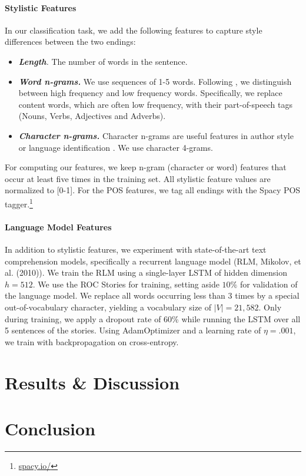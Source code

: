 \documentclass[11pt]{article}
\begin{document}
\paragraph{Stylistic Features}
In our classification task, we add the following features to capture style differences between the two endings:
\begin{itemize}
\item\textit{\textbf{Length}.} The number of words in the sentence.
\item\textit{\textbf{Word n-grams.}} We use sequences of 1-5 words. Following \cite{Tsur:2010,Schwartz:2013}, we distinguish between high frequency and low frequency words. 
Specifically, we replace content words, which are often low frequency, with their part-of-speech tags (Nouns, Verbs, Adjectives and Adverbs).
\item\textit{\textbf{Character n-grams.}} Character n-grams are useful features in author style \cite{Stamatatos:2009} or language identification \cite{lui2011cross}.
We use character 4-grams.
\end{itemize}
For computing our features, we keep n-gram (character or word) features that occur at least five times in the training set.
All stylistic feature values are normalized to [0-1].
For the POS features, we tag all endings with the Spacy POS tagger.\footnote{\url{spacy.io/}}

\paragraph{Language Model Features}
In addition to stylistic features, we experiment with state-of-the-art text comprehension models, specifically a recurrent language model (RLM, Mikolov, et al. (2010)\nocite{mikolov2010recurrent}).
We train the RLM using a single-layer LSTM \cite{hochreiter1997long} of hidden dimension $h=512$.
We use the ROC Stories for training, setting aside $10\%$ for validation of the language model. 
We replace all words occurring less than 3 times by a special out-of-vocabulary character, yielding a vocabulary size of $|V|=21,582$.
Only during training, we apply a dropout rate of 60\% while running the LSTM over all 5 sentences of the stories. 
Using AdamOptimizer \cite{kingma2014adam} and a learning rate of $\eta=.001$, we train with backpropagation on cross-entropy. %
\section{Results \& Discussion}


\section{Conclusion}




\end{document}
